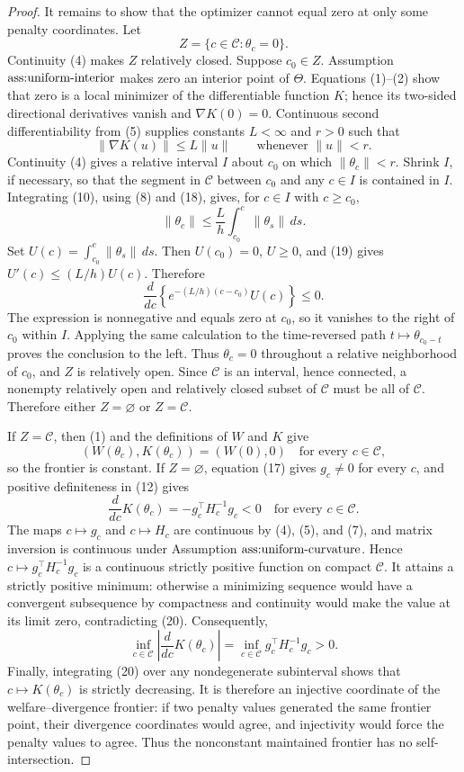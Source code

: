 \documentclass{article}
\begin{document}
\begin{proof}
It remains to show that the optimizer cannot equal zero at only some penalty coordinates.  Let
\[
 Z=\{c\in\mathcal C:\theta_c=0\}.
\]
Continuity (4) makes \(Z\) relatively closed.  Suppose \(c_0\in Z\).  Assumption \(\textnormal{ass:uniform-interior}\) makes zero an interior point of \(\Theta\).  Equations (1)--(2) show that zero is a local minimizer of the differentiable function \(K\); hence its two-sided directional derivatives vanish and \(\nabla K(0)=0\).  Continuous second differentiability from (5) supplies constants \(L<\infty\) and \(r>0\) such that
\[
 \|\nabla K(u)\|\leq L\|u\|
 \qquad\text{whenever }\|u\|<r.                               \tag{18}
\]
Continuity (4) gives a relative interval \(I\) about \(c_0\) on which \(\|\theta_c\|<r\).  Shrink \(I\), if necessary, so that the segment in \(\mathcal C\) between \(c_0\) and any \(c\in I\) is contained in \(I\).  Integrating (10), using (8) and (18), gives, for \(c\in I\) with \(c\geq c_0\),
\[
 \|\theta_c\|
 \leq\frac{L}{h}\int_{c_0}^c\|\theta_s\|\,ds.                \tag{19}
\]
Set \(U(c)=\int_{c_0}^c\|\theta_s\|\,ds\).  Then \(U(c_0)=0\), \(U\geq0\), and (19) gives \(U'(c)\leq(L/h)U(c)\).  Therefore
\[
 \frac{d}{dc}\left\{e^{-(L/h)(c-c_0)}U(c)\right\}\leq0.
\]
The expression is nonnegative and equals zero at \(c_0\), so it vanishes to the right of \(c_0\) within \(I\).  Applying the same calculation to the time-reversed path \(t\mapsto\theta_{c_0-t}\) proves the conclusion to the left.  Thus \(\theta_c=0\) throughout a relative neighborhood of \(c_0\), and \(Z\) is relatively open.  Since \(\mathcal C\) is an interval, hence connected, a nonempty relatively open and relatively closed subset of \(\mathcal C\) must be all of \(\mathcal C\).  Therefore either \(Z=\varnothing\) or \(Z=\mathcal C\).

If \(Z=\mathcal C\), then (1) and the definitions of \(W\) and \(K\) give
\[
 (W(\theta_c),K(\theta_c))=(W(0),0)
 \quad\text{for every }c\in\mathcal C,
\]
so the frontier is constant.  If \(Z=\varnothing\), equation (17) gives \(g_c\neq0\) for every \(c\), and positive definiteness in (12) gives
\[
 \frac{d}{dc}K(\theta_c)=-g_c^\top H_c^{-1}g_c<0
 \quad\text{for every }c\in\mathcal C.                        \tag{20}
\]
The maps \(c\mapsto g_c\) and \(c\mapsto H_c\) are continuous by (4), (5), and (7), and matrix inversion is continuous under Assumption \(\textnormal{ass:uniform-curvature}\).  Hence \(c\mapsto g_c^\top H_c^{-1}g_c\) is a continuous strictly positive function on compact \(\mathcal C\).  It attains a strictly positive minimum: otherwise a minimizing sequence would have a convergent subsequence by compactness and continuity would make the value at its limit zero, contradicting (20).  Consequently,
\[
 \inf_{c\in\mathcal C}
 \left|\frac{d}{dc}K(\theta_c)\right|
 =\inf_{c\in\mathcal C}g_c^\top H_c^{-1}g_c>0.                \tag{21}
\]
Finally, integrating (20) over any nondegenerate subinterval shows that \(c\mapsto K(\theta_c)\) is strictly decreasing.  It is therefore an injective coordinate of the welfare--divergence frontier: if two penalty values generated the same frontier point, their divergence coordinates would agree, and injectivity would force the penalty values to agree.  Thus the nonconstant maintained frontier has no self-intersection.
\end{proof}
\end{document}
